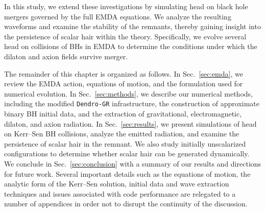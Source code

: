 In this study, we extend these investigations by simulating head on black hole mergers governed by the full EMDA equations. We analyze the resulting waveforms and examine the stability of the remnants, thereby gaining insight into the persistence of scalar hair within the theory. Specifically, we evolve several head on collisions of BHs in EMDA to determine the conditions under which the dilaton and axion fields survive merger.

The remainder of this chapter is organized as follows. In Sec.~\ref{sec:emda}, we review the EMDA action, equations of motion, and the formulation used for numerical evolution. In Sec.~\ref{sec:methods}, we describe our numerical methods, including the modified \texttt{Dendro-GR} infrastructure, the construction of approximate binary BH initial data, and the extraction of gravitational, electromagnetic, dilaton, and axion radiation. In Sec.~\ref{sec:results}, we present simulations of head on Kerr--Sen BH collisions, analyze the emitted radiation, and examine the persistence of scalar hair in the remnant. We also study initially unscalarized configurations to determine whether scalar hair can be generated dynamically. We conclude in Sec.~\ref{sec:conclusion} with a summary of our results and directions for future work. Several important details such as the equations of motion, the analytic form of the Kerr--Sen solution, initial data and wave extraction techniques and issues associated with code performance are relegated to a number of appendices in order not to disrupt the continuity of the discussion.  %

